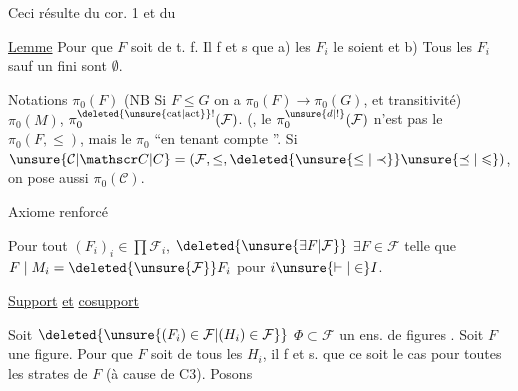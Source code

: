 Ceci résulte du  cor. 1 et du

\uline{Lemme} Pour que $F$ soit de t. f. Il f et s que a) les $F_i$ le soient et b) Tous les $F_i$ sauf un  fini sont $\emptyset$.

Notations $\pi_0(F)$ (NB Si $F\leq G$ on a $\pi_0(F)\longrightarrow\pi_0(G)$, et transitivité) $\pi_0(M)$, $\pi_0^{\deleted{\unsure{\mathrm{cat}|\mathrm{act}}}!}(\mathcal F)$. (, le $\pi_0^{\unsure{d|!}}(\mathcal F)$ n'est pas le $\pi_0(F,\leq)$, mais le $\pi_0$ ``en tenant compte  ''. Si $\unsure{\mathcal C|\mathscr C|C}=(\mathcal F,\leq,\deleted{\unsure{\leq|\prec}}\unsure{\preceq|\leqslant})$, on pose aussi $\pi_0(\mathcal C)$.

Axiome renforcé

 Pour tout $(F_i)_i\in\prod\mathcal F_i$, $\deleted{\unsure{\exists F|\mathcal F}}$ $\exists F\in\mathcal F$ telle que $F\mid M_i=\deleted{\unsure{\mathcal F}}F_i$ pour $i\unsure{\vdash|\in}I$.

\uline{ } \uline{Support} \uline{et} \uline{cosupport}

Soit $\deleted{\unsure{(F_i)\in\mathcal F|(H_i)\in\mathcal F}}$ $\Phi\subset\mathcal F$ un ens. de figures .  Soit $F$ une figure. Pour  que $F$ soit  de tous les $H_i$, il f et s. que ce soit le cas pour toutes les strates de $F$ (à cause de C3).  Posons
